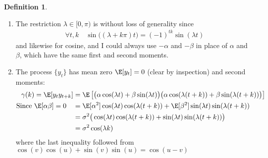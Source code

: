 \documentclass[12pt]{article}
\theoremstyle{plain}
\theoremstyle{definition}
\newtheorem{defn}[thm]{Definition}
\theoremstyle{remark}
\begin{document}
\begin{defn}
\begin{enumerate}[label=(\roman*)]
  \item The restriction $\lambda \in[0,\pi)$ is without loss of
    generality since
    \begin{align*}
      \forall t,k
      \quad
      \sin\big((\lambda + k\pi)t\big)
      =
      (-1)^{tk}\sin(\lambda t)
    \end{align*}
    and likewise for cosine, and I could always use $-\alpha$ and
    $-\beta$ in place of $\alpha$ and $\beta$, which have the same first
    and second moments.

  \item The process $\{y_t\}$ has mean zero $\E[y_t]=0$ (clear by
    inspection) and second moments:
    \begin{align*}
      \gamma(k) = \E[y_ty_{t+k}]
        &=
        \E\left[
          \big(
          \alpha \cos(\lambda t)+\beta \sin(\lambda t)
          \big)
          \big(
          \alpha \cos(\lambda (t+k))+\beta \sin(\lambda (t+k))
          \big)
        \right] \\
        \text{Since $\E[\alpha\beta]=0$}\quad
        &=
        \E[\alpha^2]
        \cos(\lambda t)\cos(\lambda (t+k))
        +
        \E[\beta^2]
        \sin(\lambda t)\sin(\lambda (t+k))
        \\
        &=
        \sigma^2
        \big(
        \cos(\lambda t)\cos(\lambda (t+k))
        + \sin(\lambda t)\sin(\lambda (t+k))
        \big)
        \\
        &=
        \sigma^2
        \cos(\lambda k)
    \end{align*}
    where the last inequality followed from
    $\cos(v)\cos(u) + \sin(v)\sin(u) =\cos(u-v)$


\end{enumerate}
\end{defn}
\end{document}
